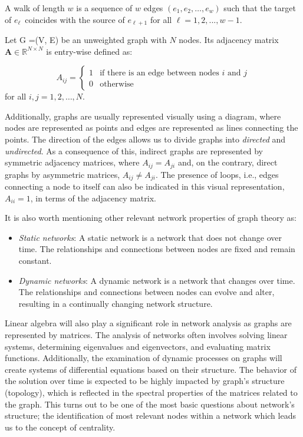 \begin{definition}
    A walk of length $w$ is a sequence of $w$ edges $(e_1, e_2, \dots, e_w)$ such that the target of $e_\ell$ coincides with the source of $e_{\ell+1}$ for all $\ell=1, 2, ..., w−1$.
\end{definition}
  
\begin{definition}
	Let G =(V, E) be an unweighted graph with $N$ nodes. Its adjacency matrix $\mathbf{A}\in\mathbb{R}^{N\times N}$ is entry-wise defined as:
 
 \begin{equation}
  A_{ij} =
    \begin{cases}
      1 & \text{if there is an edge between nodes $i$ and $j$}\\
      0 & \text{otherwise}
    \end{cases}       
\end{equation}
for all $i, j = 1,2,\dots, N$.
\end{definition}

Additionally, graphs are usually represented visually using a diagram, where nodes are represented as points and edges are represented as lines connecting the points. The direction of the edges allows us to divide graphs into \textit{directed} and \textit{undirected}. As a consequence of this, indirect graphs are represented by symmetric adjacency matrices, where $A_{ij}=A_{ji}$ and, on the contrary, direct graphs by asymmetric matrices, $A_{ij}\ne A_{ji}$. The presence of loops, i.e., edges connecting a node to itself can also be indicated in this visual representation, $A_{ii} = 1$, in terms of the adjacency matrix.

It is also worth mentioning other relevant network properties of graph theory as:

\begin{itemize}
  \item \textit{Static networks}: A static network is a network that does not change over time. The relationships and connections between nodes are fixed and remain constant. 
  \item \textit{Dynamic networks}: A dynamic network is a network that changes over time. The relationships and connections between nodes can evolve and alter, resulting in a continually changing network structure.
\end{itemize}

Linear algebra will also play a significant role in network analysis as graphs are represented by matrices. The analysis of networks often involves solving linear systems, determining eigenvalues and eigenvectors, and evaluating matrix functions. Additionally, the examination of dynamic processes on graphs will create systems of differential equations based on their structure. The behavior of the solution over time is expected to be highly impacted by graph's structure (topology), which is reflected in the spectral properties of the matrices related to the graph. This turns out to be one of the most basic questions about network's structure; the identification of most relevant nodes within a network which leads us to the concept of centrality.

